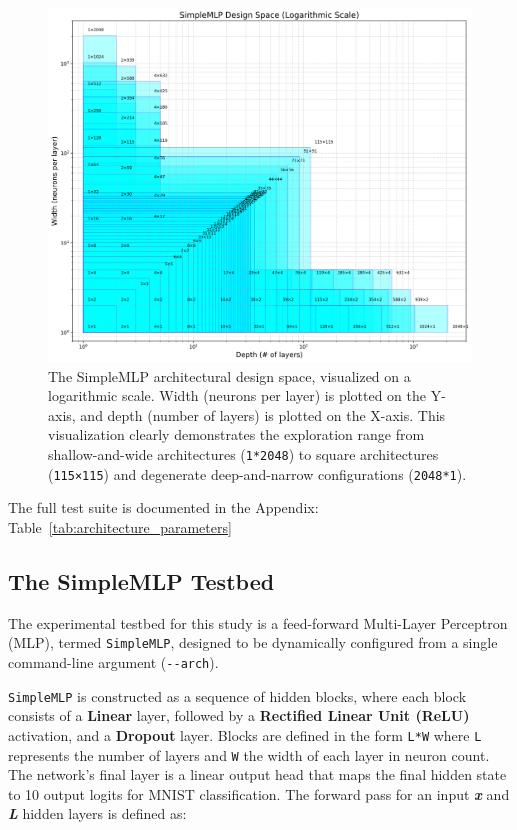 \documentclass[conference]{IEEEtran}
\begin{document}
\begin{figure}[ht]
\centering
\includegraphics[width=\columnwidth]{SimpleMLP_Testing_Design_Space.png}
\caption{The SimpleMLP architectural design space, visualized on a logarithmic scale. Width (neurons per layer) is plotted on the Y-axis, and depth (number of layers) is plotted on the X-axis. This visualization clearly demonstrates the exploration range from shallow-and-wide architectures (\texttt{1*2048}) to square architectures (\texttt{115×115}) and degenerate deep-and-narrow configurations (\texttt{2048*1}).}
\label{fig:simplemlp_design_space}
\end{figure}

The full test suite is documented in the Appendix: Table~\ref{tab:architecture_parameters}

\subsection{The SimpleMLP Testbed}

The experimental testbed for this study is a feed-forward Multi-Layer Perceptron (MLP), termed \verb|SimpleMLP|, designed to be dynamically configured from a single command-line argument (\verb|--arch|).

\verb|SimpleMLP| is constructed as a sequence of hidden blocks, where each block consists of a \textbf{Linear} layer, followed by a \textbf{Rectified Linear Unit (ReLU)} activation, and a \textbf{Dropout} layer. Blocks are defined in the form \verb|L*W| where \verb|L| represents the number of layers and \verb|W| the width of each layer in neuron count. The network's final layer is a linear output head that maps the final hidden state to 10 output logits for MNIST classification. The forward pass for an input \textit{\textbf{x}} and \textit{\textbf{L}} hidden layers is defined as: 
\end{document}
